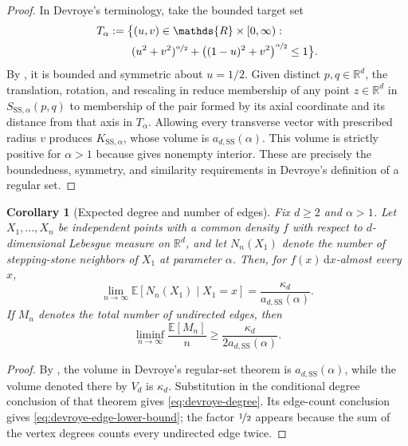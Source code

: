 \documentclass[a4paper,fleqn]{cas-dc}
\newtheorem{corollary}{Corollary}
\theoremstyle{definition}
\theoremstyle{remark}
\newcommand{\R}{\mathds{R}}
\newcommand{\E}{\mathds{E}}
\newcommand{\0}{\mathbf{0}}
\begin{document}
\begin{proof}
In Devroye's terminology, take the bounded target set
\begin{equation}
\begin{split}
T_\alpha
&:=
\bigl\{(u,v)\in\R\times[0,\infty):
\\
&\qquad
(u^2+v^2)^{\nicefrac{\alpha}{2}}
+\bigl((1-u)^2+v^2\bigr)^{\nicefrac{\alpha}{2}}
\leq 1
\bigr\}.
\end{split}
\end{equation}
By , it is bounded and symmetric about $u=1/2$.
Given distinct $p,q\in\R^d$, the translation, rotation, and rescaling in
 reduce membership of any point $z\in\R^d$ in
$S_{\mathrm{SS},\alpha}(p,q)$ to membership of the pair formed by its axial
coordinate and its distance from that axis in
$T_\alpha$. Allowing every transverse vector with prescribed radius
$v$ produces $K_{\mathrm{SS},\alpha}$, whose volume is
$a_{d,\mathrm{SS}}(\alpha)$. This volume is strictly positive for
$\alpha>1$ because  gives nonempty interior. These
are precisely the boundedness, symmetry, and similarity requirements in
Devroye's definition of a regular set.
\end{proof}

\begin{corollary}[Expected degree and number of edges]
\label{cor:devroye-degree}
Fix \(d\geq2\) and \(\alpha>1\).
Let $X_1,\ldots,X_n$ be independent points with a common density
$f$ with respect to \(d\)-dimensional Lebesgue measure on
\(\R^d\),
and let $N_n(X_1)$ denote the number of stepping-stone neighbors of $X_1$
at parameter \(\alpha\). Then, for
$f(x)\,\mathrm{d}x$-almost every $x$,
\begin{equation}\label{eq:devroye-degree}
    \lim_{n\to\infty}
    \E\!\left[N_n(X_1)\mid X_1=x\right]
    =
    \frac{\kappa_d}{a_{d,\mathrm{SS}}(\alpha)}.
\end{equation}
If $M_n$ denotes the total number of undirected edges, then
\begin{equation}\label{eq:devroye-edge-lower-bound}
    \liminf_{n\to\infty}\frac{\E[M_n]}{n}
    \geq
    \frac{\kappa_d}{2a_{d,\mathrm{SS}}(\alpha)}.
\end{equation}
\end{corollary}

\begin{proof}
By , the volume in
Devroye's regular-set theorem is $a_{d,\mathrm{SS}}(\alpha)$, while the
volume denoted there by $V_d$ is $\kappa_d$. Substitution in the conditional
degree conclusion of that theorem gives \eqref{eq:devroye-degree}. Its
edge-count conclusion gives \eqref{eq:devroye-edge-lower-bound}; the factor
$\nicefrac{1}{2}$ appears because the sum of the vertex degrees counts every undirected
edge twice.
\end{proof}
\end{document}
